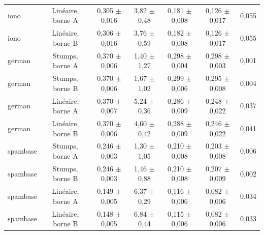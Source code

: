 \begin{table}[tbp]
{\begin{tabular}{lcccccc}
iono & Linéaire, borne A & 0,305 $\pm$ 0,016 & 3,82 $\pm$ 0,48 & 0,181 $\pm$ 0,008 & 0,126 $\pm$ 0,017 & 0,055 \\
iono & Linéaire, borne B & 0,306 $\pm$ 0,016 & 3,76 $\pm$ 0,59 & 0,182 $\pm$ 0,008 & 0,126 $\pm$ 0,017 & 0,055 \\
german & Stumps, borne A & 0,370 $\pm$ 0,006 & 1,40 $\pm$ 1,27 & 0,298 $\pm$ 0,004 & 0,298 $\pm$ 0,003 & 0,001 \\
german & Stumps, borne B & 0,370 $\pm$ 0,006 & 1,67 $\pm$ 1,02 & 0,299 $\pm$ 0,006 & 0,295 $\pm$ 0,008 & 0,004 \\
german & Linéaire, borne A & 0,370 $\pm$ 0,007 & 5,24 $\pm$ 0,36 & 0,286 $\pm$ 0,009 & 0,248 $\pm$ 0,022 & 0,037 \\
german & Linéaire, borne B & 0,370 $\pm$ 0,006 & 4,60 $\pm$ 0,42 & 0,288 $\pm$ 0,009 & 0,246 $\pm$ 0,022 & 0,041 \\
spambase & Stumps, borne A & 0,246 $\pm$ 0,003 & 1,30 $\pm$ 1,05 & 0,210 $\pm$ 0,008 & 0,203 $\pm$ 0,008 & 0,006 \\
spambase & Stumps, borne B & 0,246 $\pm$ 0,003 & 1,46 $\pm$ 0,88 & 0,210 $\pm$ 0,008 & 0,207 $\pm$ 0,009 & 0,002 \\
spambase & Linéaire, borne A & 0,149 $\pm$ 0,005 & 6,37 $\pm$ 0,29 & 0,116 $\pm$ 0,006 & 0,082 $\pm$ 0,006 & 0,034 \\
spambase & Linéaire, borne B & 0,148 $\pm$ 0,005 & 6,84 $\pm$ 0,44 & 0,115 $\pm$ 0,006 & 0,082 $\pm$ 0,006 & 0,033 \\
\bottomrule
\end{tabular}
}
\end{table}
